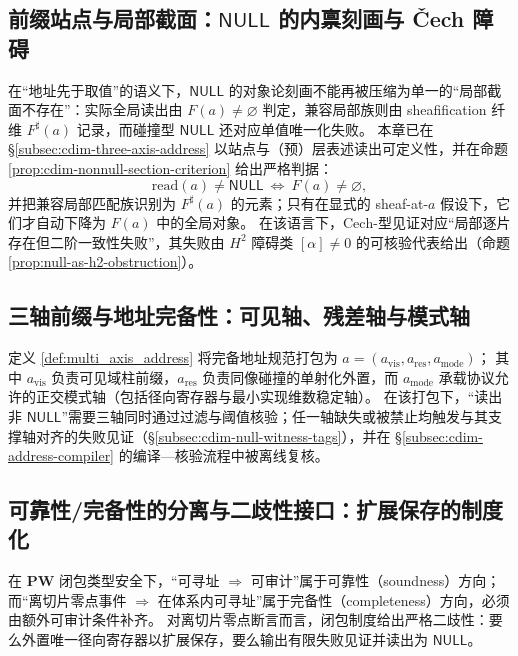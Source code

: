 \subsection{前缀站点与局部截面：\texorpdfstring{$\mathsf{NULL}$}{NULL} 的内禀刻画与 \v{C}ech 障碍}\label{subsec:cdim-prefix-site-local-sections-null}
在“地址先于取值”的语义下，\(\mathsf{NULL}\) 的对象论刻画不能再被压缩为单一的“局部截面不存在”：实际全局读出由 \(F(a)\neq\varnothing\) 判定，兼容局部族则由 sheafification 纤维 \(F^\sharp(a)\) 记录，而碰撞型 \(\mathsf{NULL}\) 还对应单值唯一化失败。
本章已在 \S\ref{subsec:cdim-three-axis-address} 以站点与（预）层表述读出可定义性，并在命题 \ref{prop:cdim-nonnull-section-criterion} 给出严格判据：
\[
\mathrm{read}(a)\neq \mathsf{NULL}\ \Longleftrightarrow\ F(a)\neq\varnothing,
\]
并把兼容局部匹配族识别为 \(F^\sharp(a)\) 的元素；只有在显式的 sheaf-at-\(a\) 假设下，它们才自动下降为 \(F(a)\) 中的全局对象。
在该语言下，\(\mathrm{Cech}\)-型见证对应“局部逐片存在但二阶一致性失败”，其失败由 \(H^2\) 障碍类 \([\alpha]\neq 0\) 的可核验代表给出（命题 \ref{prop:null-as-h2-obstruction}）。





\subsection{三轴前缀与地址完备性：可见轴、残差轴与模式轴}\label{subsec:cdim-three-axis-prefix-completeness}
定义 \ref{def:multi_axis_address} 将完备地址规范打包为
\(
a=(a_{\mathrm{vis}},a_{\mathrm{res}},a_{\mathrm{mode}})
\)；
其中 \(a_{\mathrm{vis}}\) 负责可见域柱前缀，\(a_{\mathrm{res}}\) 负责同像碰撞的单射化外置，而 \(a_{\mathrm{mode}}\) 承载协议允许的正交模式轴（包括径向寄存器与最小实现维数稳定轴）。
在该打包下，“读出非 \(\mathsf{NULL}\)”需要三轴同时通过过滤与阈值核验；任一轴缺失或被禁止均触发与其支撑轴对齐的失败见证（\S\ref{subsec:cdim-null-witness-tags}），并在 \S\ref{subsec:cdim-address-compiler} 的编译—核验流程中被离线复核。

\subsection{可靠性/完备性的分离与二歧性接口：扩展保存的制度化}\label{subsec:cdim-soundness-completeness-dichotomy}
在 \(\mathbf{PW}\) 闭包类型安全下，“可寻址 \(\Rightarrow\) 可审计”属于可靠性（soundness）方向；而“离切片零点事件 \(\Rightarrow\) 在体系内可寻址”属于完备性（completeness）方向，必须由额外可审计条件补齐。
对离切片零点断言而言，闭包制度给出严格二歧性：要么外置唯一径向寄存器以扩展保存，要么输出有限失败见证并读出为 \(\mathsf{NULL}\)。

